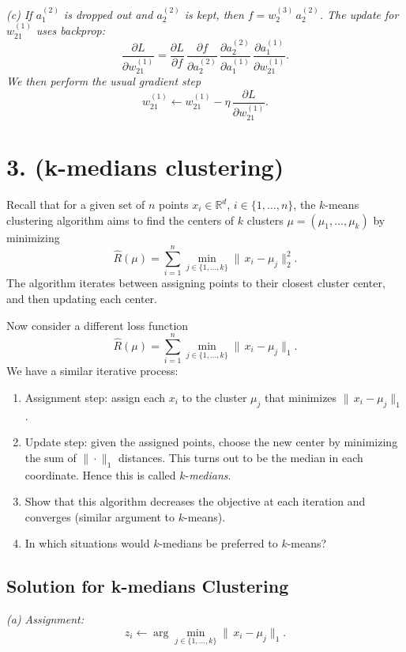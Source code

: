 \documentclass[twocolumn]{article}
\begin{document}
\begin{spacing}{1}
\noindent
\emph{(c) If $a_1^{(2)}$ is dropped out and $a_2^{(2)}$ is kept, then $f = w_{2}^{(3)}\,a_2^{(2)}$. 
The update for $w_{21}^{(1)}$ uses backprop:
\[
\frac{\partial L}{\partial w_{21}^{(1)}} 
= \frac{\partial L}{\partial f}\,\frac{\partial f}{\partial a_2^{(2)}} \,
\frac{\partial a_2^{(2)}}{\partial a_1^{(1)}} \,\frac{\partial a_1^{(1)}}{\partial w_{21}^{(1)}}.
\]
We then perform the usual gradient step 
\[
w_{21}^{(1)} \leftarrow w_{21}^{(1)} - \eta \,\frac{\partial L}{\partial w_{21}^{(1)}}.
\]}

\section{3. (k-medians clustering)}

Recall that for a given set of $n$ points $x_i\in \mathbb{R}^d$, $i\in\{1,\dots,n\}$, the $k$-means clustering
algorithm aims to find the centers of $k$ clusters $\mu = (\mu_1,\dots,\mu_k)$ by minimizing
\[
\hat{R}(\mu) 
= 
\sum_{i=1}^n \min_{j\in\{1,\dots,k\}} \|\,x_i - \mu_j\|_2^2.
\]
The algorithm iterates between assigning points to their closest cluster center, and then updating each center.

Now consider a different loss function
\[
\hat{R}(\mu) 
= 
\sum_{i=1}^n \min_{j\in\{1,\dots,k\}} \|\,x_i - \mu_j\|_1.
\]
We have a similar iterative process:

\begin{enumerate}
\item Assignment step: assign each $x_i$ to the cluster $\mu_j$ that minimizes $\|\,x_i - \mu_j\|_1$.
\item Update step: given the assigned points, choose the new center by minimizing the sum of $\|\cdot\|_1$
distances. This turns out to be the median in each coordinate. Hence this is called $k$-\emph{medians}.
\item Show that this algorithm decreases the objective at each iteration and converges (similar argument
to $k$-means).
\item In which situations would $k$-medians be preferred to $k$-means?
\end{enumerate}

\subsection*{Solution for k-medians Clustering}

\noindent
\emph{(a) Assignment:}
\[
z_i \leftarrow \arg\min_{j\in\{1,\dots,k\}} \|\,x_i - \mu_j\|_1.
\]


\end{spacing}
\end{document}

